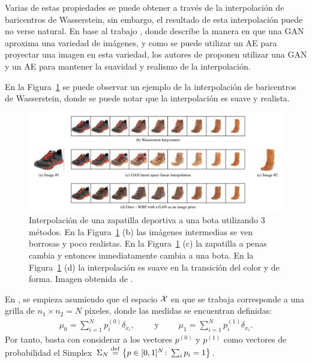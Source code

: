 Varias de estas propiedades se puede obtener a través de la interpolación de baricentros de Wasserstein, sin embargo, el resultado de esta interpolación puede no verse natural.
En base al trabajo \cite{zhu2016generative}, donde describe la manera en que una GAN aproxima una variedad de imágenes, y como se puede utilizar un AE para proyectar una imagen en esta variedad, los autores de \cite{simon2020barycenters} proponen utilizar una GAN y un AE para mantener la suavidad y realismo de la interpolación.

En la Figura~\ref{fig:interpolacion-wass-bar-gan} se puede observar un ejemplo de la interpolación de baricentros de Wasserstein, donde se puede notar que la interpolación es suave y realista.

\begin{figure}[H]
	\centering
	\includegraphics[width=\textwidth]{img/cbw/interpolacion-wass-bar-gan.png}
	\caption{
		Interpolación de una zapatilla deportiva a una bota utilizando 3 métodos. En la Figura~\ref{fig:interpolacion-wass-bar-gan} (b) las imágenes intermedias se ven borrosas y poco realistas. En la Figura~\ref{fig:interpolacion-wass-bar-gan} (c) la zapatilla a penas cambia y entonces inmediatamente cambia a una bota. En la Figura~\ref{fig:interpolacion-wass-bar-gan} (d) la interpolación es suave en la transición del color y de forma. Imagen obtenida de \cite{simon2020barycenters}.
	}
	\label{fig:interpolacion-wass-bar-gan}
\end{figure}


En \cite{simon2020barycenters}, se empieza asumiendo que el espacio $\cX$ en que se trabaja corresponde a una grilla de $n_1 \times n_2 = N$ píxeles, donde las medidas se encuentran definidas:
\begin{align*}
	\mu_0 = \sum_{i=1}^{N} p^{(0)}_i \delta_{x_i},
	\qquad \text{ y } \qquad
	\mu_1 = \sum_{i=1}^{N} p^{(1)}_i \delta_{x_i}.
\end{align*}
Por tanto, basta con considerar a los vectores $p^{(0)}$ y $p^{(1)}$ como vectores de probabilidad el Simplex $\Simplex[N] \eqdef \left\{ p \in [0, 1]^{N} \colon \sum_i p_i = 1 \right\}$.

